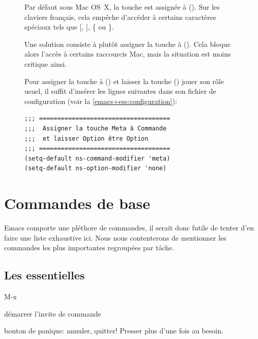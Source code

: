 \begin{figure}[t]
  \begin{osx}
    Par défaut sous Mac OS~X, la touche  est assignée à
     (\optkey). Sur les claviers français, cela empêche
    d'accéder à certains caractères spéciaux tels que [, ], \{ ou \}.

    Une solution consiste à plutôt assigner la touche  à
     (\cmdkey). Cela bloque alors l'accès à certains
    raccourcis Mac, mais la situation est moins critique ainsi.

    Pour assigner la touche  à  (\cmdkey) et
    laisser la touche  (\optkey) jouer son rôle usuel, il
    suffit d'insérer les lignes suivantes dans son fichier de
    configuration  (voir la
    \autoref{emacs+ess:configuration}):
\begin{verbatim}
;;; ====================================
;;;  Assigner la touche Meta à Commande
;;;  et laisser Option être Option
;;; ====================================
(setq-default ns-command-modifier 'meta)
(setq-default ns-option-modifier 'none)
\end{verbatim}
  \end{osx}
  \label{fig:ess:meta}
\end{figure}



\section{Commandes de base}
\label{emacs+ess:commandes}

Emacs comporte une pléthore de commandes, il serait donc futile de
tenter d'en faire une liste exhaustive ici. Nous nous contenterons de
mentionner les commandes les plus importantes regroupées par tâche.


\subsection{Les essentielles}
\label{emacs+ess:commandes:essentielles}

\begin{ttscript}{M-x}
\item[\emacs{M-x}] démarrer l'invite de commande
\item[\emacs{C-g}] bouton de panique: annuler, quitter! Presser plus
  d'une fois au besoin.
\end{ttscript}

